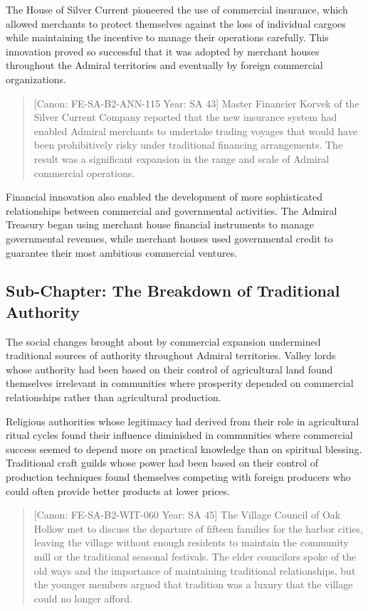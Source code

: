 The House of Silver Current pioneered the use of commercial insurance,
which allowed merchants to protect themselves against the loss of
individual cargoes while maintaining the incentive to manage their
operations carefully. This innovation proved so successful that it was
adopted by merchant houses throughout the Admiral territories and
eventually by foreign commercial organizations.

\begin{quote}
{[}Canon: FE-SA-B2-ANN-115 \textbar{} Year: SA 43{]} Master Financier
Korvek of the Silver Current Company reported that the new insurance
system had enabled Admiral merchants to undertake trading voyages that
would have been prohibitively risky under traditional financing
arrangements. The result was a significant expansion in the range and
scale of Admiral commercial operations.
\end{quote}

Financial innovation also enabled the development of more sophisticated
relationships between commercial and governmental activities. The
Admiral Treasury began using merchant house financial instruments to
manage governmental revenues, while merchant houses used governmental
credit to guarantee their most ambitious commercial ventures.

\subsection{Sub-Chapter: The Breakdown of Traditional
Authority}\label{sub-chapter-the-breakdown-of-traditional-authority}

The social changes brought about by commercial expansion undermined
traditional sources of authority throughout Admiral territories. Valley
lords whose authority had been based on their control of agricultural
land found themselves irrelevant in communities where prosperity
depended on commercial relationships rather than agricultural
production.

Religious authorities whose legitimacy had derived from their role in
agricultural ritual cycles found their influence diminished in
communities where commercial success seemed to depend more on practical
knowledge than on spiritual blessing. Traditional craft guilds whose
power had been based on their control of production techniques found
themselves competing with foreign producers who could often provide
better products at lower prices.

\begin{quote}
{[}Canon: FE-SA-B2-WIT-060 \textbar{} Year: SA 45{]} The Village Council
of Oak Hollow met to discuss the departure of fifteen families for the
harbor cities, leaving the village without enough residents to maintain
the community mill or the traditional seasonal festivals. The elder
councilors spoke of the old ways and the importance of maintaining
traditional relationships, but the younger members argued that tradition
was a luxury that the village could no longer afford.
\end{quote}

